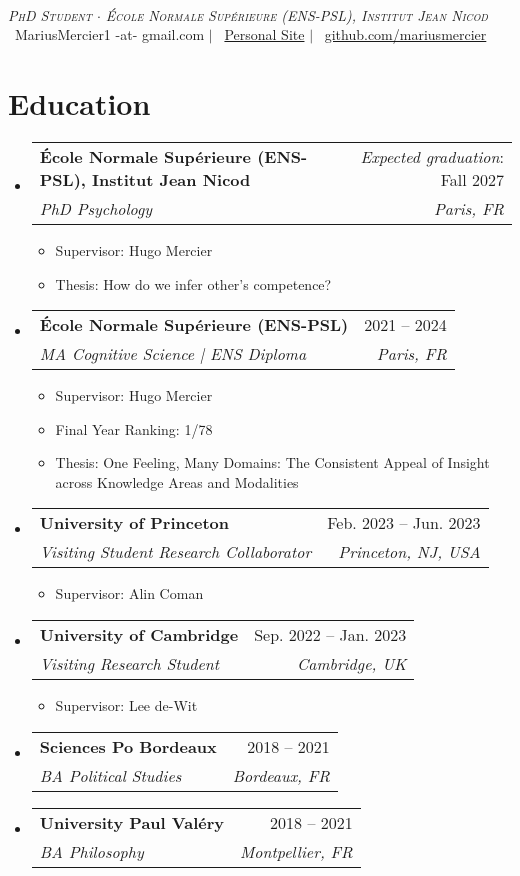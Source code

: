 \documentclass[letterpaper,11pt]{article}
\makeatletter
\newcommand{\resumeItem}[1]{
  \item\small{
    {#1 \vspace{-2pt}}
  }
}
\newcommand{\resumeSubheading}[4]{
  \vspace{1pt}\item
    \begin{tabular*}{0.97\textwidth}[t]{l@{\extracolsep{\fill}}r}
      \textbf{#1} & #2 \\
      \textit{\small#3} & \textit{\small #4} \\
    \end{tabular*}\vspace{-7pt}
}
\newcommand{\resumeSubHeadingListStart}{\begin{itemize}[leftmargin=0.15in, label={}]}
\newcommand{\resumeSubHeadingListEnd}{\end{itemize}}
\newcommand{\resumeItemListStart}{\begin{itemize}}
\newcommand{\resumeItemListEnd}{\end{itemize}\vspace{-5pt}}
\makeatother
\begin{document}

\begin{center}
     \\ \vspace{1pt}
    \textit{\scshape PhD Student $\cdot$ École Normale Supérieure (ENS-PSL), Institut Jean Nicod} \\ \vspace{1pt}
    \small 
    \faEnvelope\ MariusMercier1 -at- gmail.com $|$ 
    \faHome\ \href{https://mariusmercier.github.io}{Personal Site} $|$
    \faGithub\ \href{https://github.com/mariusmercier/}{github.com/mariusmercier}
\end{center}



\section{Education}
  \resumeSubHeadingListStart
    \resumeSubheading
      {École Normale Supérieure (ENS-PSL), Institut Jean Nicod}{\textit{Expected graduation}: Fall 2027}
      {PhD Psychology}{Paris, FR}
            \resumeItemListStart
        \resumeItem{Supervisor: Hugo Mercier}
        \resumeItem{Thesis: How do we infer other's competence?}
      \resumeItemListEnd
    \resumeSubheading
      {École Normale Supérieure (ENS-PSL)}{2021 -- 2024}
      {MA Cognitive Science | ENS Diploma}{Paris, FR}
            \resumeItemListStart
        \resumeItem{Supervisor: Hugo Mercier}
        \resumeItem{Final Year Ranking: 1/78}            
        \resumeItem{Thesis: One Feeling, Many Domains: The Consistent Appeal of Insight across Knowledge Areas and Modalities}
      \resumeItemListEnd
    \resumeSubheading
      {University of Princeton}{Feb. 2023 -- Jun. 2023}
      {Visiting Student Research Collaborator}{Princeton, NJ, USA}
          \resumeItemListStart
        \resumeItem{Supervisor: Alin Coman}
      \resumeItemListEnd
    \resumeSubheading
      {University of Cambridge}{Sep. 2022 -- Jan. 2023}
      {Visiting Research Student}{Cambridge, UK}
          \resumeItemListStart
        \resumeItem{Supervisor: Lee de-Wit}
      \resumeItemListEnd
    \resumeSubheading
      {Sciences Po Bordeaux}{2018 -- 2021}
      {BA Political Studies}{Bordeaux, FR}
    \resumeSubheading
      {University Paul Valéry}{2018 -- 2021}
      {BA Philosophy}{Montpellier, FR}
  \resumeSubHeadingListEnd
\end{document}

